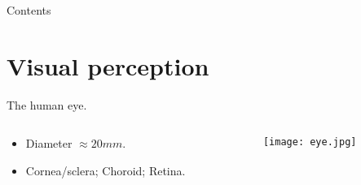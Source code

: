 


\subtitle{Fundamentals}





\begin{frame}
\titlepage %
\end{frame}


\begin{frame}{Contents}
\setcounter{tocdepth}{1}
\tableofcontents
\end{frame}


\section{Visual perception}


\begin{frame}
The human eye.
\begin{columns}
\begin{column}{.3\textwidth}
\begin{itemize}
\item Diameter $\approx 20mm$.
\item Cornea/sclera; Choroid; Retina.
\end{itemize}
\end{column}
\begin{column}{.7\textwidth}
\begin{figure}
\texttt{[image: eye.jpg]}
\end{figure}
\end{column}
\end{columns}
\end{frame}

